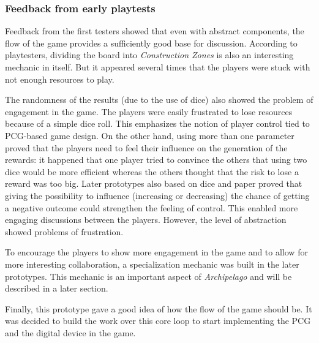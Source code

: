 \subsubsection{Feedback from early playtests}
Feedback from the first testers showed that even with abstract components, the flow of the game provides a sufficiently good base for discussion. According to playtesters, dividing the board into \textit{Construction Zones} is also an interesting mechanic in itself. But it appeared several times that the players were stuck with not enough resources to play.

The randomness of the results (due to the use of dice) also showed the problem of engagement in the game. The players were easily frustrated to lose resources because of a simple dice roll. This emphasizes the notion of player control tied to PCG-based game design. On the other hand, using more than one parameter proved that the players need to feel their influence on the generation of the rewards: it happened that one player tried to convince the others that using two dice would be more efficient whereas the others thought that the risk to lose a reward was too big. Later prototypes also based on dice and paper proved that giving the possibility to influence (increasing or decreasing) the chance of getting a negative outcome could strengthen the feeling of control. This enabled more engaging discussions between the players. However, the level of abstraction showed problems of frustration.


To encourage the players to show more engagement in the game and to allow for more interesting collaboration, a specialization mechanic was built in the later prototypes. This mechanic is an important aspect of \textit{Archipelago} and will be described in a later section. 
 
Finally, this prototype gave a good idea of how the flow of the game should be. It was decided to build the work over this core loop to start implementing the PCG and the digital device in the game.


